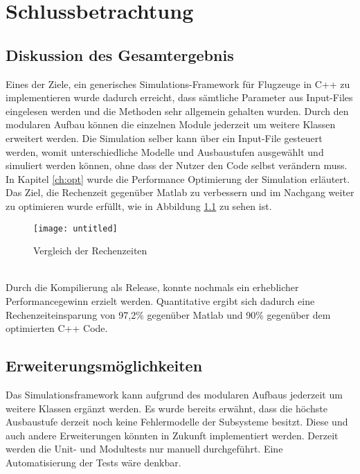\chapter{Schlussbetrachtung}
\section{Diskussion des Gesamtergebnis}
Eines der Ziele, ein generisches Simulations-Framework für Flugzeuge in C++ zu implementieren wurde dadurch erreicht, dass sämtliche Parameter aus Input-Files eingelesen werden und die Methoden sehr allgemein gehalten wurden. Durch den modularen Aufbau können die einzelnen Module jederzeit um weitere Klassen erweitert werden. Die Simulation selber kann über ein Input-File gesteuert werden, womit unterschiedliche Modelle und Ausbaustufen ausgewählt und simuliert werden können, ohne dass der Nutzer den Code selbst verändern muss. In Kapitel \ref{ch:opt} wurde die Performance Optimierung der Simulation erläutert. Das Ziel, die Rechenzeit gegenüber Matlab  zu verbessern und im Nachgang weiter zu optimieren wurde erfüllt, wie in Abbildung \ref{fig:optergeb} zu sehen ist. 
\begin{figure}[h]
	\centering
	\texttt{[image: untitled]}
	\caption{Vergleich der Rechenzeiten}
	\label{fig:optergeb}
\end{figure}\noindent\\
Durch die Kompilierung als Release, konnte nochmals ein erheblicher Performancegewinn erzielt werden. Quantitative ergibt sich dadurch eine Rechenzeiteinsparung von 97,2\% gegenüber Matlab und 90\% gegenüber dem optimierten C++ Code.
\section{Erweiterungsmöglichkeiten}
Das Simulationsframework kann aufgrund des modularen Aufbaus jederzeit um weitere Klassen ergänzt werden. Es wurde bereits erwähnt, dass die höchste Ausbaustufe derzeit noch keine Fehlermodelle der Subsysteme besitzt. Diese und auch andere Erweiterungen könnten in Zukunft implementiert werden. Derzeit werden die Unit- und Modultests nur manuell durchgeführt. Eine Automatisierung der Tests wäre denkbar.
